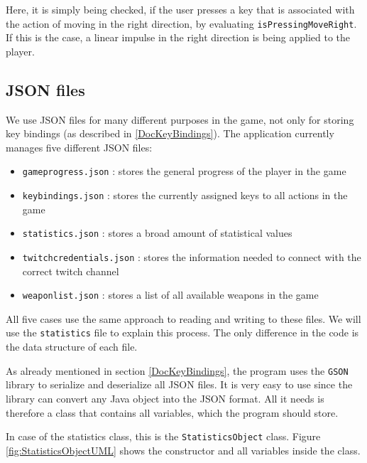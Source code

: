 \documentclass[12p]{article}
\begin{document}
Here, it is simply being checked, if the user presses a key that is associated with the action of moving in the right direction, by evaluating \texttt{isPressingMoveRight}. If this is the case, a linear impulse in the right direction is being applied to the player.


\newpage
\subsection{JSON files} \label{DocJSONfiles}

We use JSON files for many different purposes in the game, not only for storing key bindings (as described in \ref{DocKeyBindings}). The application currently manages five different JSON files: 

\begin{itemize}
    \item[\faFile] \texttt{gameprogress.json} : stores the general progress of the player in the game
    \item[\faFile] \texttt{keybindings.json} : stores the currently assigned keys to all actions in the game
    \item[\faFile] \texttt{statistics.json} : stores a broad amount of statistical values
    \item[\faFile] \texttt{twitchcredentials.json} : stores the information needed to connect with the correct twitch channel
    \item[\faFile] \texttt{weaponlist.json} : stores a list of all available weapons in the game
\end{itemize}

All five cases use the same approach to reading and writing to these files. We will use the \texttt{statistics} file to explain this process. The only difference in the code is the data structure of each file.

As already mentioned in section \ref{DocKeyBindings}, the program uses the \texttt{GSON} library to serialize and deserialize all JSON files. It is very easy to use since the library can convert any Java object into the JSON format. All it needs is therefore a class that contains all variables, which the program should store.

In case of the statistics class, this is the \texttt{StatisticsObject} class. Figure \ref{fig:StatisticsObjectUML} shows the constructor and all variables inside the class.
\end{document}
